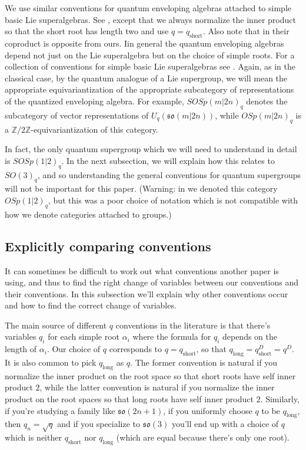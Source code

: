 \documentclass[12pt]{amsart}
\begin{document}
We use similar conventions for quantum enveloping algebras attached to simple basic Lie superalgebras.  See \cite{MR1266383,MR1892766}, except that we always normalize the inner product so that the short root has length two and use $q = q_{\mathrm{short}}$.  Also note that in \cite{MR1266383} their coproduct is opposite from ours.  Iin general the quantum enveloping algebras depend not just on the Lie superalgebra but on the choice of simple roots.
For a collection of conventions for simple basic Lie superalgebras see \cite{MR1773773}.  Again, as in the classical case, by the 
quantum analogue of a Lie supergroup, we will mean the appropriate equivariantization of the appropriate subcategory
of representations of the quantized enveloping algebra.  For example, $SOSp(m|2n)_q$ denotes the subcategory of vector representations of $U_q(\mathfrak{so}(m|2n))$, while $OSp(m|2n)_q$ is a $\mathbb{Z}/2\mathbb{Z}$-equivariantization of this category.

In fact, the only quantum supergroup which we will need to understand in detail is $SOSp(1|2)_q$.
In the next subsection, we will explain how this relates to $SO(3)_q$, and so understanding the general conventions for
quantum supergroups will not be important for this paper.  (Warning: in \cite{MR3624901} we denoted this category $OSp(1|2)_q$,
but this was a poor choice of notation which is not compatible with how we denote categories attached to groups.)

\subsection{Explicitly comparing conventions}

It can sometimes be difficult to work out what conventions another paper is using, and thus to find the right change of variables between our conventions and their conventions.  In this subsection we'll explain why other conventions occur and how to find the correct change of variables.

The main source of different $q$ conventions in the literature is that there's
variables $q_i$ for each simple root $\alpha_i$ where the formula for $q_i$
depends on the length of $\alpha_i$.  Our choice of $q$ corresponds to 
$q = q_{\mathrm{short}}$, so that $q_{\mathrm{long}} = q_{\mathrm{short}}^D = q^D$.
It is also common to pick $q_{\mathrm{long}}$ as $q$.   The former convention is natural
if you normalize the inner product on the root space so that short roots have self inner product $2$, while the latter
convention is natural if you normalize the inner product on the root spaces so that long roots have self inner product $2$.
Similarly, if you're studying a family like $\mathfrak{so}(2n+1)$, if you uniformly choose $q$ to be $q_{\mathrm{long}}$, 
then $q_n = \sqrt{q}$ and if you specialize to $\mathfrak{so}(3)$ you'll end up with a choice of $q$ which is neither
$q_{\mathrm{short}}$ nor $q_{\mathrm{long}}$ (which are equal because there's only one root).
\end{document}
